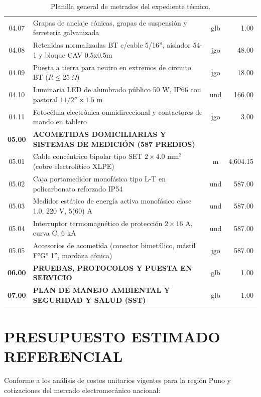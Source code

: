 \begin{table}[H]
\begin{tabular}{|c|l|c|r|}
04.07 & Grapas de anclaje cónicas, grapas de suspensión y ferretería galvanizada & glb & 1.00 \\
04.08 & Retenidas normalizadas BT c/cable 5/16'', aislador 54-1 y bloque CAV 0.5x0.5m & jgo & 48.00 \\
04.09 & Puesta a tierra para neutro en extremos de circuito BT ($R \le 25\ \Omega$) & jgo & 18.00 \\
04.10 & Luminaria LED de alumbrado público 50 W, IP66 con pastoral $1 1/2'' \times 1.5\text{ m}$ & und & 166.00 \\
04.11 & Fotocélula electrónica omnidireccional y contactores de mando en tablero & jgo & 3.00 \\
\hline
\textbf{05.00} & \textbf{ACOMETIDAS DOMICILIARIAS Y SISTEMAS DE MEDICIÓN (587 PREDIOS)} & & \\
05.01 & Cable concéntrico bipolar tipo SET $2 \times 4.0\text{ mm}^2$ (cobre electrolítico XLPE) & m & 4,604.15 \\
05.02 & Caja portamedidor monofásica tipo L-T en policarbonato reforzado IP54 & und & 587.00 \\
05.03 & Medidor estático de energía activa monofásico clase 1.0, 220 V, 5(60) A & und & 587.00 \\
05.04 & Interruptor termomagnético de protección $2 \times 16\text{ A}$, curva C, 6 kA & und & 587.00 \\
05.05 & Accesorios de acometida (conector bimetálico, mástil F°G° 1'', mordaza cónica) & jgo & 587.00 \\
\hline
\textbf{06.00} & \textbf{PRUEBAS, PROTOCOLOS Y PUESTA EN SERVICIO} & glb & 1.00 \\
\textbf{07.00} & \textbf{PLAN DE MANEJO AMBIENTAL Y SEGURIDAD Y SALUD (SST)} & glb & 1.00 \\
\hline
\end{tabular}
\caption{Planilla general de metrados del expediente técnico.}
\end{table}

\section{PRESUPUESTO ESTIMADO REFERENCIAL}

Conforme a los análisis de costos unitarios vigentes para la región Puno y cotizaciones del mercado electromecánico nacional:

